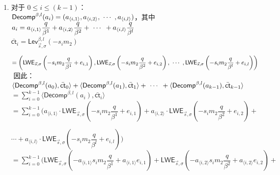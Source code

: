 \begin{myproof}
\begin{enumerate}
\item 对于 $0 \leq i \leq (k - 1)$： \\
$\textsf{Decomp}^{\beta, l}(a_i) = (a_{\langle i, 1 \rangle}, a_{\langle i, 2 \rangle}, \text{ } \text{$\cdots$} \text{ }, a_{\langle i, l \rangle})$，其中 $a_i = a_{\langle i, 1 \rangle}\dfrac{q}{\beta^1} + a_{\langle i, 2 \rangle}\dfrac{q}{\beta^2} + \text{ } \text{$\cdots$} \text{ } + a_{\langle i, l \rangle}\dfrac{q}{\beta^l}$ \\
$\bar{\textsf{ct}}_i =  \textsf{Lev}_{\vec{s}, \sigma}^{\beta, l}(-s_im_2) $

$= \left(\textsf{LWE}_{\vec{s}, \sigma}\left(-s_im_2\dfrac{q}{\beta^1} + e_{i, 1}\right), \textsf{LWE}_{\vec{s}, \sigma}\left(-s_im_2\dfrac{q}{\beta^2} + e_{i, 2}\right), \text{ } \text{$\cdots$} \text{ }, \textsf{LWE}_{\vec{s}, \sigma}\left(-s_im_2\dfrac{q}{\beta^l} + e_{i, l}\right) \right)$ \\

$ $
因此： \\
$\langle \textsf{Decomp}^{\beta, l}(a_0), \bar{\textsf{ct}}_0 \rangle + \langle \textsf{Decomp}^{\beta, l}(a_1), \bar{\textsf{ct}}_1 \rangle + \text{ } \text{$\cdots$} \text{ } + \langle \textsf{Decomp}^{\beta, l}(a_{k-1}), \bar{\textsf{ct}}_{k-1} \rangle$ \\
$= \sum\limits_{i=0}^{k-1}\langle \textsf{Decomp}^{\beta, l}(a_i), \bar{\textsf{ct}}_i \rangle$ \\
$= \sum\limits_{i=0}^{k-1}\Bigg(a_{\langle i, 1\rangle} \cdot \textsf{LWE}_{\vec{s}, \sigma}\left(-s_im_2\dfrac{q}{\beta^1} + e_{i,1}\right) + a_{\langle i, 2\rangle} \cdot \textsf{LWE}_{\vec{s}, \sigma}\left(-s_im_2\dfrac{q}{\beta^2} + e_{i,2}\right) + $

$ \cdots +  a_{\langle i, l\rangle} \cdot \textsf{LWE}_{\vec{s}, \sigma}\left(-s_im_2\dfrac{q}{\beta^l} + e_{i,l}\right)\Bigg)$ \\
$= \sum\limits_{i=0}^{k-1}\Bigg(\textsf{LWE}_{\vec{s}, \sigma}\left(-a_{\langle i, 1\rangle}s_im_2\dfrac{q}{\beta^1} + a_{\langle i, 1 \rangle}e_{i,1}\right) + \textsf{LWE}_{\vec{s}, \sigma}\left(-a_{\langle i, 2\rangle}s_im_2\dfrac{q}{\beta^2} + a_{\langle i, 2 \rangle}e_{i,2}\right) + $


\end{enumerate}
\end{myproof}

